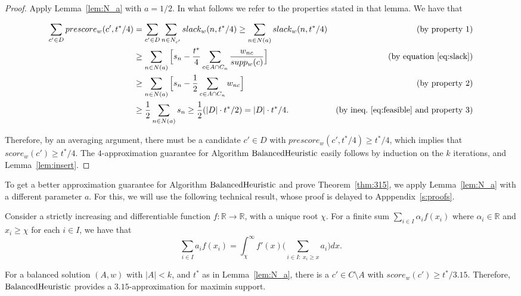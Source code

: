 \begin{proof}
Apply Lemma~\ref{lem:N_a} with $a=1/2$. In what follows we refer to the properties stated in that lemma. We have that

\begin{align*}
    \sum_{c'\in D} prescore_w(c',t^*/4) &=\sum_{c'\in D} \sum_{n\in N_{c'}} slack_w(n,t^*/4)
    \geq \sum_{n\in N(a)} slack_w(n,t^*/4) & \text{(by property 1)}\\
    &\geq \sum_{n\in N(a)} \Big[ s_n - \frac{t^*}{4}\sum_{c\in A\cap C_n} \frac{w_{nc}}{supp_w(c)} \Big] &\text{(by equation \ref{eq:slack})}\\
    &\geq \sum_{n\in N(a)} \Big[ s_n - \frac{1}{2}\sum_{c\in A\cap C_n} w_{nc} \Big] &\text{(by property 2)}\\
    &\geq \frac{1}{2}\sum_{n\in N(a)} s_n \geq \frac{1}{2} (|D|\cdot t^*/2) = |D|\cdot t^*/4. 
    &\text{(by ineq.~\ref{eq:feasible} and property 3)}
\end{align*}

Therefore, by an averaging argument, there must be a candidate $c'\in D$ with $prescore_w(c',t^*/4)\geq t^*/4$, which implies that $score_w(c')\geq t^*/4$. The $4$-approximation guarantee for Algorithm $\operatorname{BalancedHeuristic}$ easily follows by induction on the $k$ iterations, and Lemma~\ref{lem:insert}.
\end{proof}

To get a better approximation guarantee for Algorithm $\operatorname{BalancedHeuristic}$ and prove Theorem~\ref{thm:315}, we apply Lemma~\ref{lem:N_a} with a different parameter $a$. For this, we will use the following technical result, whose proof is delayed to Apppendix~\ref{s:proofs}.

\begin{lemma}\label{lem:Lebesgue}
Consider a strictly increasing and differentiable function $f:\mathbb{R}\rightarrow \mathbb{R}$, with a unique root $\chi$. For a finite sum $\sum_{i\in I} \alpha_i f(x_i)$ where $\alpha_i\in\mathbb{R}$ and $ x_i\geq \chi$ for each $i\in I$, we have that
$$\sum_{i\in I} a_i f(x_i) = \int_{\chi}^{\infty} f'(x) \big(\sum_{i\in I: \ x_i\geq x} a_i\big)dx.$$
\end{lemma}

\begin{lemma}
For a balanced solution $(A,w)$ with $|A|<k$, and $t^*$ as in Lemma~\ref{lem:N_a}, there is a $c'\in C\setminus A$ with $score_w(c')\geq t^*/3.15$. 
Therefore, $\operatorname{BalancedHeuristic}$ provides a $3.15$-approximation for maximin support.
\end{lemma}


